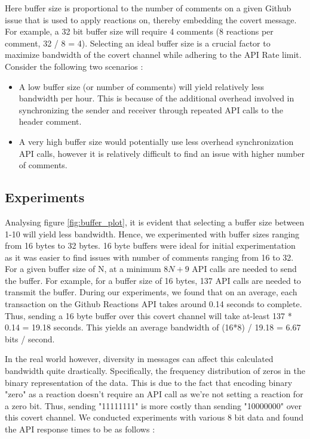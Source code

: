 \documentclass[conference]{IEEEtran}
\begin{document}


Here buffer size is proportional to the number of comments on a given Github issue that is used to apply reactions on, thereby embedding the covert message. For example, a 32 bit buffer size will require 4 comments (8 reactions per comment, 32 / 8 = 4). Selecting an ideal buffer size is a crucial factor to maximize bandwidth of the covert channel while adhering to the API Rate limit. Consider the following two scenarios : 
\begin{itemize}
\item A low buffer size (or number of comments) will yield relatively less bandwidth per hour. This is because of the additional overhead involved in synchronizing the sender and receiver through repeated API calls to the header comment.
\item A very high buffer size would potentially use less overhead synchronization API calls, however it is relatively difficult to find an issue with higher number of comments.
\end{itemize}

\subsection{Experiments}

Analysing figure \ref{fig:buffer_plot}, it is evident that selecting a buffer size between 1-10 will yield less bandwidth. Hence, we experimented with buffer sizes ranging from 16 bytes to 32 bytes. 16 byte buffers were ideal for initial experimentation as it was easier to find issues with number of comments ranging from 16 to 32. For a given buffer size of N, at a minimum \(8N + 9\) API calls are needed to send the buffer. For example, for a buffer size of 16 bytes, 137 API calls are needed to transmit the buffer. During our experiments, we found that on an average, each transaction on the Github Reactions API takes around 0.14 seconds to complete. Thus, sending a 16 byte buffer over this covert channel will take at-least 137 * 0.14 = 19.18 seconds. This yields an average bandwidth of (16*8) / 19.18 = 6.67 bits / second.

In the real world however, diversity in messages can affect this calculated bandwidth quite drastically. Specifically, the frequency distribution of zeros in the binary representation of the data. This is due to the fact that encoding binary "zero" as a reaction doesn't require an API call as we're not setting a reaction for a zero bit. Thus, sending "11111111" is more costly than sending "10000000" over this covert channel. We conducted experiments with various 8 bit data and found the API response times to be as follows : 
\end{document}
